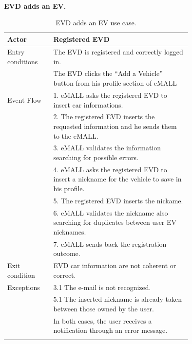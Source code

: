 \textbf{EVD adds an EV.}
\begin{center}
    \begin{longtable}{lp{0.75\linewidth}}
        \hline
        Actor            & Registered EVD                                                                                \\
        \hline
        Entry conditions & The EVD is registered and correctly logged in.                                                \\
        & The EVD clicks the ``Add a Vehicle'' button from his profile section of eMALL                 \\
        \hline
        Event Flow       & 1. eMALL asks the registered EVD to insert car informations.                                  \\
        & 2. The registered EVD inserts the requested information and he sends them to the eMALL.       \\
        & 3. eMALL validates the information searching for possible errors.                             \\
        & 4. eMALL asks the registered EVD to insert a nickname for the vehicle to save in his profile. \\
        & 5. The registered EVD inserts the nickame.                                                    \\
        & 6. eMALL validates the nickname also searching for duplicates between user EV nicknames.      \\
        & 7. eMALL sends back the registration outcome.                                                 \\
        \hline
        Exit condition   & EVD car information are not coherent or correct.                                              \\
        \hline
        Exceptions       & 3.1 The e-mail is not recognized.                                                             \\
        & 5.1 The inserted nickname is already taken between those owned by the user.                   \\
        & In both cases, the user receives a notification through an error message.                     \\
        \hline
        \caption{EVD adds an EV use case.}
        \label{tab: EVD_adds_a_vehicle_use_case}
    \end{longtable}
\end{center}

